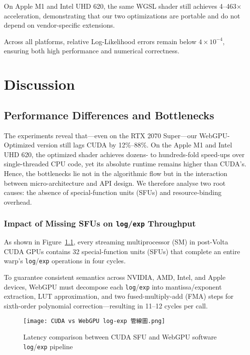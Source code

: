 \documentclass[PhD]{PHlab-thesis}
\begin{document}
On Apple M1 and Intel UHD 620, the same WGSL shader still achieves 4–463$\times$ acceleration, demonstrating that our two optimizations are portable and do not depend on vendor-specific extensions.

Across all platforms, relative Log-Likelihood errors remain below $4 \times 10^{-4}$, ensuring both high performance and numerical correctness.




\chapter{Discussion}
\section{Performance Differences and Bottlenecks}
The experiments reveal that—even on the RTX 2070 Super—our WebGPU-Optimized version still lags CUDA by 12\%–88\%. On the Apple M1 and Intel UHD 620, the optimized shader achieves dozens- to hundreds-fold speed-ups over single-threaded CPU code, yet its absolute runtime remains higher than CUDA's. Hence, the bottlenecks lie not in the algorithmic flow but in the interaction between micro-architecture and API design. We therefore analyse two root causes: the absence of special-function units (SFUs) and resource-binding overhead.

\subsection{Impact of Missing SFUs on \texttt{log}/\texttt{exp} Throughput}
As shown in Figure~\ref{fig:log_exp_pipeline}, every streaming multiprocessor (SM) in post-Volta CUDA GPUs contains 32 special-function units (SFUs) that complete an entire warp's \texttt{log}/\texttt{exp} operations in four cycles.

To guarantee consistent semantics across NVIDIA, AMD, Intel, and Apple devices, WebGPU must decompose each \texttt{log}/\texttt{exp} into mantissa/exponent extraction, LUT approximation, and two fused-multiply-add (FMA) steps for sixth-order polynomial correction—resulting in 11–12 cycles per call.


\begin{figure}[h]
    \centering
    \texttt{[image: CUDA vs WebGPU log-exp 管線圖.png]}
    \caption{Latency comparison between CUDA SFU and WebGPU software \texttt{log}/\texttt{exp} pipeline}
    \label{fig:log_exp_pipeline}
\end{figure}
\end{document}
